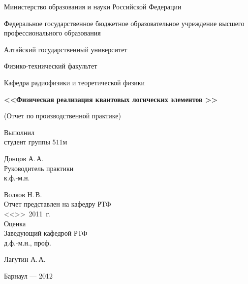 \documentclass[14pt,a4paper]{PhDthesis}
\begin{document}
\thispagestyle{empty}
\begin{center}
\enlargethispage{3cm}

{\Large\sc Министерство образования и науки Российской Федерации}

\bigskip
{\large Федеральное государственное бюджетное образовательное учреждение высшего профессионального образования}

{\large Алтайский государственный университет}

\bigskip
{\large Физико-технический факультет}

\bigskip
{Кафедра радиофизики и теоретической физики }
\bigskip

\vfill
\vfill
{\Large\sf\bf <<Физическая реализация квантовых логических элементов >>}
\bigskip

{\sf (Отчет по производственной практике)}


\vfill
\hfill
\parbox[b]{7cm}{\raggedright
Выполнил\\
студент группы $511$м \\
{}\rule{0pt}{2ex}\hrulefill Донцов А.\,А.\\
Руководитель практики\\
к.ф.-м.н.\\
{}\rule{0pt}{2ex}\hrulefill Волков Н.\,В.\\
Отчет представлен на кафедру РТФ\\
{}<<\makebox[2em]{\rule{0pt}{4ex}\hrulefill}>>\hrulefill \ 2011\ г.\\
Оценка \hrulefill\\
Заведующий кафедрой РТФ\\
д.ф.-м.н., проф. \\
{}\rule{0pt}{2ex}\hrulefill Лагутин А.\,А.\\
}

\vfill
\vfill

\center
Барнаул --- 2012
\end{center}
\newpage
\tableofcontents
\newpage
\end{document}
